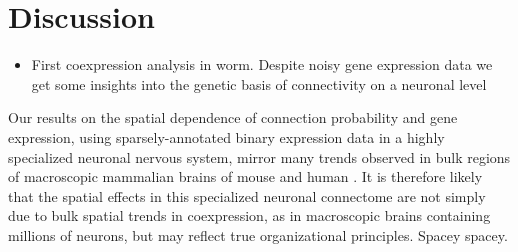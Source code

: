 \documentclass[10pt,letterpaper]{article}
\begin{document}
%
%
%
%
%

\section*{Discussion}
\begin{itemize}
    \item{First coexpression analysis in worm. Despite noisy gene expression data we get some insights into the genetic basis of connectivity on a neuronal level}
\end{itemize}

Our results on the spatial dependence of connection probability and gene expression, using sparsely-annotated binary expression data in a highly specialized neuronal nervous system, mirror many trends observed in bulk regions of macroscopic mammalian brains of mouse \cite{Fulcher:2016ck} and human \cite{Krienen:2016eq}.
It is therefore likely that the spatial effects in this specialized neuronal connectome are not simply due to bulk spatial trends in coexpression, as in macroscopic brains containing millions of neurons, but may reflect true organizational principles.
Spacey spacey.
\end{document}
